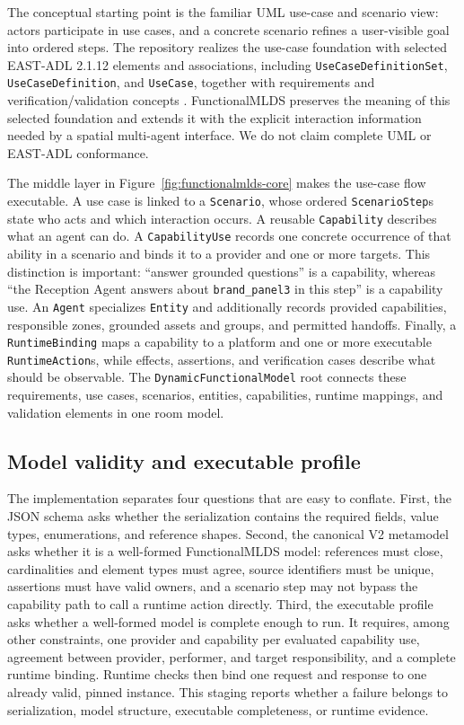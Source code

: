 The conceptual starting point is the familiar UML use-case and scenario view:
actors participate in use cases, and a concrete scenario refines a user-visible goal
into ordered steps.  The repository realizes the use-case foundation with selected
EAST-ADL 2.1.12 elements and associations, including
\texttt{UseCaseDefinitionSet}, \texttt{UseCaseDefinition}, and \texttt{UseCase},
together with requirements and verification/validation concepts
\cite{eastadl2013spec}.  FunctionalMLDS preserves the meaning of this selected
foundation and extends it with the explicit interaction information needed by a
spatial multi-agent interface.  We do not claim complete UML or EAST-ADL
conformance.

The middle layer in Figure~\ref{fig:functionalmlds-core} makes the use-case
flow executable.  A use case is linked
to a \texttt{Scenario}, whose ordered \texttt{ScenarioStep}s state who acts and
which interaction occurs.  A reusable \texttt{Capability} describes what an agent
can do.  A \texttt{CapabilityUse} records one concrete occurrence of that ability
in a scenario and binds it to a provider and one or more targets.  This distinction
is important: ``answer grounded questions'' is a capability, whereas ``the
Reception Agent answers about \texttt{brand\_panel3} in this step'' is a capability
use.  An \texttt{Agent} specializes \texttt{Entity} and additionally records
provided capabilities, responsible zones, grounded assets and groups, and permitted
handoffs.  Finally, a \texttt{RuntimeBinding} maps a capability to a platform and
one or more executable \texttt{RuntimeAction}s, while effects, assertions, and
verification cases describe what should be observable.  The
\texttt{DynamicFunctionalModel} root connects these requirements, use cases,
scenarios, entities, capabilities, runtime mappings, and validation elements in one
room model.

\subsection{Model validity and executable profile}

The implementation separates four questions that are easy to conflate.
First, the JSON schema asks whether the serialization contains the required
fields, value types, enumerations, and reference shapes.  Second, the canonical
V2 metamodel asks whether it is a well-formed FunctionalMLDS model: references
must close, cardinalities and element types must agree, source identifiers must
be unique, assertions must have valid owners, and a scenario step may not bypass
the capability path to call a runtime action directly.  Third, the executable
profile asks whether a well-formed model is complete enough to run.  It requires,
among other constraints, one provider and capability per evaluated capability
use, agreement between provider, performer, and target responsibility, and a
complete runtime binding.  Runtime checks then bind one request and response to
one already valid, pinned instance.  This staging reports whether a failure
belongs to serialization, model structure, executable completeness, or runtime
evidence.

